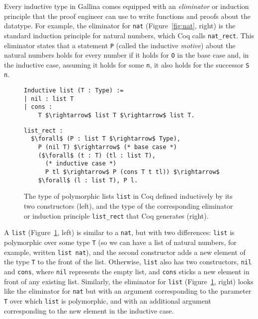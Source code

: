 Every inductive type in Gallina comes equipped with an \textit{eliminator} or induction principle
that the proof engineer can use to write functions and proofs about the datatype.
For example, the eliminator for \lstinline{nat} (Figure~\ref{fig:nat}, right) is the standard induction principle for natural numbers,
which Coq calls \lstinline{nat_rect}. %
This eliminator states that a statement \lstinline{P} (called the inductive \textit{motive}) about the natural numbers
holds for every number if it holds for \lstinline{O} in the base case and, in the inductive case,
assuming it holds for some \lstinline{n}, it also holds for the successor \lstinline{S n}.

\begin{figure}
\begin{minipage}{0.44\textwidth}
\begin{lstlisting}
Inductive list (T : Type) :=
| nil : list T
| cons :
    T $\rightarrow$ list T $\rightarrow$ list T.
\end{lstlisting}
\end{minipage}
\hfill
\begin{minipage}{0.54\textwidth}
\begin{lstlisting}
list_rect :
  $\forall$ (P : list T $\rightarrow$ Type),
    P (nil T) $\rightarrow$ (* base case *)
    ($\forall$ (t : T) (tl : list T),
      (* inductive case *)
      P tl $\rightarrow$ P (cons T t tl)) $\rightarrow$
    $\forall$ (l : list T), P l.
\end{lstlisting}
\end{minipage}
\caption{The type of polymorphic lists \lstinline{list} in Coq defined inductively by its two constructors (left), and the type of the corresponding eliminator or induction principle \lstinline{list_rect} that Coq generates (right).}
\label{fig:list}
\end{figure}


A \lstinline{list} (Figure~\ref{fig:list}, left) is similar to a \lstinline{nat}, 
but with two differences: \lstinline{list} is polymorphic over some type \lstinline{T} (so we can have a list of natural numbers,
for example, written \lstinline{list nat}), and the second constructor adds a new element of the type \lstinline{T} to the front of the list.
Otherwise, \lstinline{list} also has two constructors, \lstinline{nil} and \lstinline{cons}, where \lstinline{nil} represents the empty list,
and \lstinline{cons} sticks a new element in front of any existing list.
Similarly, the eliminator for \lstinline{list} (Figure~\ref{fig:list}, right) looks like the eliminator for \lstinline{nat} 
but with an argument corresponding to the parameter \lstinline{T} over which \lstinline{list} is polymorphic,
and with an additional argument corresponding to the new element in the inductive case.

